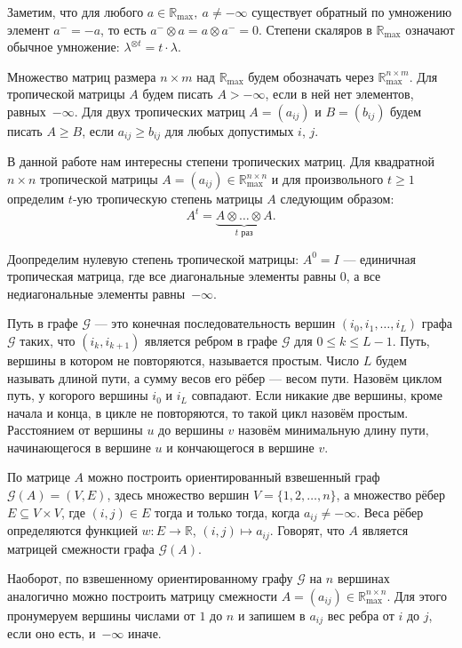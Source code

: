 \documentclass[12pt]{article}
\theoremstyle{definition}
\begin{document}
Заметим, что для любого $a \in \mathbb{R}_{\max}, \ a \ne -\infty$ существует обратный по умножению элемент $a^- = -a$, то есть $a^- \otimes a = a \otimes a^- = 0$. Степени скаляров в $\mathbb{R}_{\max}$ означают обычное умножение: $\lambda^{\otimes t} = t \cdot \lambda$.

Множество матриц размера $n \times m$ над $\mathbb{R}_{\max}$ будем обозначать через $\mathbb{R}_{\max}^{n \times m}$. Для тропической матрицы $A$ будем писать $A > -\infty$, если в ней нет элементов, равных~$-\infty$. Для двух тропических матриц $A = (a_{ij})$ и $B = (b_{ij})$ будем писать $A \ge B$, если $a_{ij} \ge b_{ij}$ для любых допустимых $i$, $j$.

В данной работе нам интересны степени тропических матриц. Для квадратной $n \times n$ тропической матрицы $A = (a_{ij}) \in \mathbb{R}_{\max}^{n \times n}$ и для произвольного $t \ge 1$ определим $t$-ую тропическую степень матрицы $A$ следующим образом: \begin{equation*}
A^t = \underbrace{A \otimes \dots \otimes A}_{t \text{ раз}}.
\end{equation*}

Доопределим нулевую степень тропической матрицы: $A^0 = I$ --- единичная тропическая матрица, где все диагональные элементы равны $0$, а все недиагональные элементы равны~$-\infty$.

Путь в графе $\mathcal{G}$ --- это конечная последовательность вершин $(i_0, i_1, \dots, i_L)$ графа $\mathcal{G}$ таких, что $(i_k, i_{k + 1})$ является ребром в графе $\mathcal{G}$ для $0 \le k \le L - 1$. Путь, вершины в котором не повторяются, называется простым. Число $L$ будем называть длиной пути, а сумму весов его рёбер --- весом пути. Назовём циклом путь, у когорого вершины $i_0$ и $i_L$ совпадают. Если никакие две вершины, кроме начала и конца, в цикле не повторяются, то такой цикл назовём простым. Расстоянием от вершины $u$ до вершины $v$ назовём минимальную длину пути, начинающегося в вершине $u$ и кончающегося в вершине $v$.

По матрице $A$ можно построить ориентированный взвешенный граф $\mathcal{G}(A) = (V, E)$, здесь множество вершин $V = \{ 1, 2, \dots, n\}$, а множество рёбер $E \subseteq V \times V$, где $(i, j) \in E$ тогда и только тогда, когда $a_{ij} \ne -\infty$. Веса рёбер определяются функцией $w : E \rightarrow \mathbb{R}$, $(i, j) \mapsto a_{ij}$. Говорят, что $A$ является матрицей смежности графа $\mathcal{G}(A)$.

Наоборот, по взвешенному ориентированному графу $\mathcal{G}$ на $n$ вершинах аналогично можно построить матрицу смежности $A = (a_{ij}) \in \mathbb{R}_{\max}^{n \times n}$. Для этого пронумеруем вершины числами от $1$ до $n$ и запишем в $a_{ij}$ вес ребра от $i$ до $j$, если оно есть, и~$-\infty$ иначе.
\end{document}
